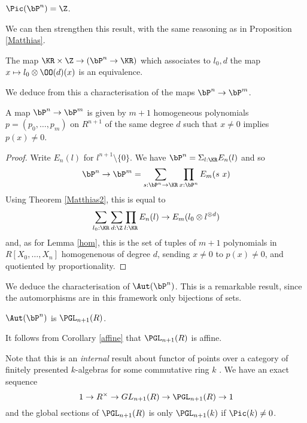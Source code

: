 \begin{corollary}
  $\Pic(\bP^n) = \Z$.
\end{corollary}

We can then strengthen this result, with the same reasoning as in Proposition \ref{Matthias}.

\begin{theorem}\label{Matthias2}
  The map $\KR\times\Z\rightarrow (\bP^n\rightarrow \KR)$
  which associates to $l_0,d$ the map $x\mapsto l_0\otimes \OO(d)(x)$ is an equivalence.
\end{theorem}

We deduce from this a characterisation of the maps $\bP^n\rightarrow\bP^m$.%

\begin{corollary}\label{map}
  A map $\bP^n\rightarrow\bP^m$ is given by $m+1$ homogeneous polynomials $p = (p_0,\dots,p_m)$ on $R^{n+1}$
  of the same   degree $d$ such that $x\neq 0$ implies $p(x)\neq 0$.
\end{corollary}

\begin{proof}
Write $E_n(l)$ for $l^{n+1}\setminus\{0\}$. We have $\bP^n = \Sigma_{l:\KR}E_n(l)$ and so
$$
\bP^n\rightarrow\bP^m = \sum_{s:\bP^n\rightarrow \KR}\prod_{x:\bP^n}E_m(s~x)
$$
Using Theorem \ref{Matthias2}, this is equal to
$$
\sum_{l_0:\KR}\sum_{d:\Z}\prod_{l:\KR}E_n(l)\rightarrow E_m(l_0\otimes l^{\otimes d})
$$
and, as for Lemma \ref{hom}, this is the set of tuples of $m+1$ polynomials in $R[X_0,\dots,X_n]$ homogenenous
of degree $d$, sending $x\neq 0$ to $p(x)\neq 0$, and quotiented by proportionality.
\end{proof}

We deduce the characterisation of $\Aut(\bP^n)$. This is a
remarkable result, since the automorphisms are in this framework only bijections of sets.

\begin{corollary}
  $\Aut(\bP^n)$ is $\PGL_{n+1}(R)$.
\end{corollary}

It follows from Corollary \ref{affine} that $\PGL_{n+1}(R)$ is affine.

\medskip

Note that this is an {\em internal} result about functor of points over a category of
finitely presented $k$-algebras for some commutative ring $k$ \cite{draft}. We have an exact sequence
$$
1\rightarrow R^{\times}\rightarrow GL_{n+1}(R)\rightarrow \PGL_{n+1}(R)\rightarrow 1
$$
and the global sections of $\PGL_{n+1}(R)$ is only $\PGL_{n+1}(k)$ if $\Pic(k)\neq 0$.

